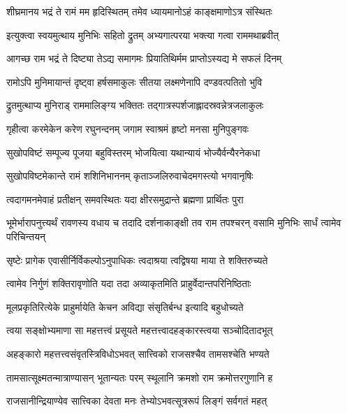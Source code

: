 
\twolineshloka
{शीघ्रमानय भद्रं ते रामं मम हृदिस्थितम्}
{तमेव ध्यायमानोऽहं काङ्क्षमाणोऽत्र संस्थितः} %

\twolineshloka
{इत्युक्त्वा स्वयमुत्थाय मुनिभिः सहितो द्रुतम्}
{अभ्यगात्परया भक्त्या गत्वा राममथाब्रवीत्} %

\twolineshloka
{आगच्छ राम भद्रं ते दिष्ट्या तेऽद्य समागमः}
{प्रियातिथिर्मम प्राप्तोऽस्यद्य मे सफलं दिनम्} %

\twolineshloka
{रामोऽपि मुनिमायान्तं दृष्ट्वा हर्षसमाकुलः}
{सीतया लक्ष्मणेनापि दण्डवत्पतितो भुवि} %

\twolineshloka
{द्रुतमुत्थाप्य मुनिराड् राममालिङ्ग्य भक्तितः}
{तद्गात्रस्पर्शजाह्लादस्रवन्नेत्रजलाकुलः} %

\twolineshloka
{गृहीत्वा करमेकेन करेण रघुनन्दनम्}
{जगाम स्वाश्रमं हृष्टो मनसा मुनिपुङ्गवः} %

\twolineshloka
{सुखोपविष्टं सम्पूज्य पूजया बहुविस्तरम्}
{भोजयित्वा यथान्यायं भोज्यैर्वन्यैरनेकधा} %

\twolineshloka
{सुखोपविष्टमेकान्ते रामं शशिनिभाननम्}
{कृताञ्जलिरुवाचेदमगस्त्यो भगवानृषिः} %

\twolineshloka
{त्वदागमनमेवाहं प्रतीक्षन् समवस्थितः}
{यदा क्षीरसमुद्रान्ते ब्रह्मणा प्रार्थितः पुरा} %

\threelineshloka
{भूमेर्भारापनुत्त्यर्थं रावणस्य वधाय च}
{तदादि दर्शनाकाङ्क्षी तव राम तपश्चरन्}
{वसामि मुनिभिः सार्धं त्वामेव परिचिन्तयन्} %

\twolineshloka
{सृष्टेः प्रागेक एवासीर्निर्विकल्पोऽनुपाधिकः}
{त्वदाश्रया त्वद्विषया माया ते शक्तिरुच्यते} %

\twolineshloka
{त्वामेव निर्गुणं शक्तिरावृणोति यदा तदा}
{अव्याकृतमिति प्राहुर्वेदान्तपरिनिष्ठिताः} %

\twolineshloka
{मूलप्रकृतिरित्येके प्राहुर्मायेति केचन}
{अविद्या संसृतिर्बन्ध इत्यादि बहुधोच्यते} %

\twolineshloka
{त्वया सङ्क्षोभ्यमाणा सा महत्तत्त्वं प्रसूयते}
{महत्तत्त्वादहङ्कारस्त्वया सञ्चोदितादभूत्} %

\twolineshloka
{अहङ्कारो महत्तत्त्वसंवृतस्त्रिविधोऽभवत्}
{सात्त्विको राजसश्चैव तामसश्चेति भण्यते} %

\twolineshloka
{तामसात्सूक्ष्मतन्मात्राण्यासन् भूतान्यतः परम्}
{स्थूलानि क्रमशो राम क्रमोत्तरगुणानि ह} %

\twolineshloka
{राजसानीन्द्रियाण्येव सात्त्विका देवता मनः}
{तेभ्योऽभवत्सूत्ररूपं लिङ्गं सर्वगतं महत्} %

